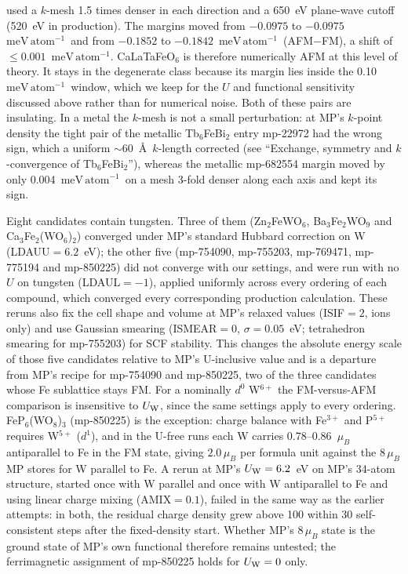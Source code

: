 \documentclass[aps,prb,preprint,superscriptaddress,longbibliography,nofootinbib]{revtex4-2}
\newcommand{\meVat}{\ensuremath{\mathrm{meV\,atom^{-1}}}}
\begin{document}
used a $k$-mesh 1.5 times denser in each direction and a 650~eV plane-wave cutoff (520~eV in production). The margins
moved from $-0.0975$ to $-0.0975$~\meVat\ and from $-0.1852$ to $-0.1842$~\meVat\ (AFM$-$FM), a shift of
$\le0.001$~\meVat. CaLaTaFeO$_6$ is therefore numerically AFM at this level of theory. It stays in the
degenerate class because its margin lies inside the 0.10~\meVat\ window, which we keep for the $U$ and
functional sensitivity discussed above rather than for numerical noise. Both of these pairs are insulating.
In a metal the $k$-mesh is not a small perturbation: at MP's $k$-point density the tight pair of the metallic
Tb$_6$FeBi$_2$ entry mp-22972 had the wrong sign, which a uniform $\sim$60~\AA\ $k$-length corrected (see
``Exchange, symmetry and $k$-convergence of Tb$_6$FeBi$_2$''), whereas the metallic mp-682554 margin moved
by only 0.004~\meVat\ on a mesh 3-fold denser along each axis and kept its sign.

Eight candidates contain tungsten. Three of them (Zn$_2$FeWO$_6$, Ba$_3$Fe$_2$WO$_9$ and Ca$_3$Fe$_2$(WO$_6$)$_2$)
converged under MP's standard Hubbard correction on W (LDAUU$=6.2$~eV); the other five (mp-754090, mp-755203,
mp-769471, mp-775194 and mp-850225) did not converge with our settings, and were run with no $U$ on tungsten
(LDAUL$=-1$), applied uniformly across every ordering of each compound, which converged every corresponding
production calculation. These reruns also fix the cell shape and volume at MP's relaxed values (ISIF$=2$, ions
only) and use Gaussian smearing (ISMEAR$=0$, $\sigma=0.05$~eV; tetrahedron smearing for mp-755203) for SCF
stability. This changes the absolute energy scale of those five candidates relative to MP's U-inclusive value
and is a departure from MP's recipe for mp-754090 and mp-850225, two of the three candidates whose Fe
sublattice stays FM. For a
nominally $d^0$ W$^{6+}$ the FM-versus-AFM comparison is insensitive to $U_{\rm W}$, since the same settings
apply to every ordering. FeP$_6$(WO$_8$)$_3$ (mp-850225) is the exception: charge balance with Fe$^{3+}$ and
P$^{5+}$ requires W$^{5+}$ ($d^1$), and in the U-free runs each W carries 0.78--0.86~$\mu_B$ antiparallel to Fe
in the FM state, giving $2.0\,\mu_B$ per formula unit against the $8\,\mu_B$ MP stores for W parallel to Fe.
A rerun at MP's $U_{\rm W}=6.2$~eV on MP's 34-atom structure, started once with W parallel and once with W
antiparallel to Fe and using linear charge mixing (AMIX$=0.1$), failed in the same way as the earlier attempts:
in both, the residual charge density grew above 100 within 30 self-consistent steps after the fixed-density
start. Whether MP's $8\,\mu_B$ state is the ground state of MP's own functional therefore remains untested;
the ferrimagnetic assignment of mp-850225 holds for $U_{\rm W}=0$ only.
\end{document}
